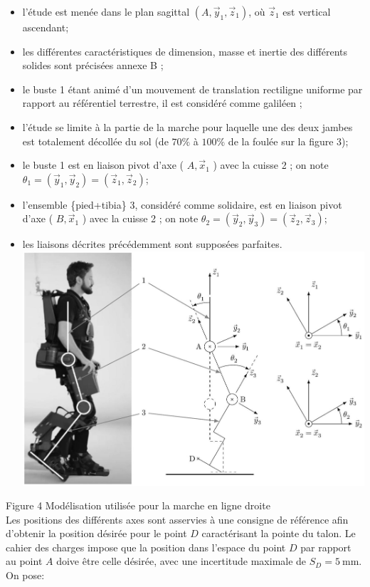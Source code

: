 \documentclass[10pt]{article}
\begin{document}
\begin{itemize}
  \item l'étude est menée dans le plan sagittal $\left(A, \vec{y}_{1}, \vec{z}_{1}\right)$, où $\vec{z}_{1}$ est vertical ascendant;
  \item les différentes caractéristiques de dimension, masse et inertie des différents solides sont précisées annexe B ;
  \item le buste 1 étant animé d'un mouvement de translation rectiligne uniforme par rapport au référentiel terrestre, il est considéré comme galiléen ;
  \item l'étude se limite à la partie de la marche pour laquelle une des deux jambes est totalement décollée du sol (de $70 \%$ à $100 \%$ de la foulée sur la figure 3);
  \item le buste 1 est en liaison pivot d'axe ( $A, \vec{x}_{1}$ ) avec la cuisse 2 ; on note $\theta_{1}=\left(\vec{y}_{1}, \vec{y}_{2}\right)=\left(\vec{z}_{1}, \vec{z}_{2}\right)$;
  \item l'ensemble \{pied+tibia\} 3, considéré comme solidaire, est en liaison pivot d'axe ( $B, \vec{x}_{1}$ ) avec la cuisse 2 ; on note $\theta_{2}=\left(\vec{y}_{2}, \vec{y}_{3}\right)=\left(\vec{z}_{2}, \vec{z}_{3}\right)$;
  \item les liaisons décrites précédemment sont supposées parfaites.\\
\includegraphics[max width=\textwidth, center]{2025_07_03_97545f5dc188959e5663g-03}
\end{itemize}

Figure 4 Modélisation utilisée pour la marche en ligne droite\\
Les positions des différents axes sont asservies à une consigne de référence afin d'obtenir la position désirée pour le point $D$ caractérisant la pointe du talon. Le cahier des charges impose que la position dans l'espace du point $D$ par rapport au point $A$ doive être celle désirée, avec une incertitude maximale de $S_{D}=5 \mathrm{~mm}$. On pose:
\end{document}
